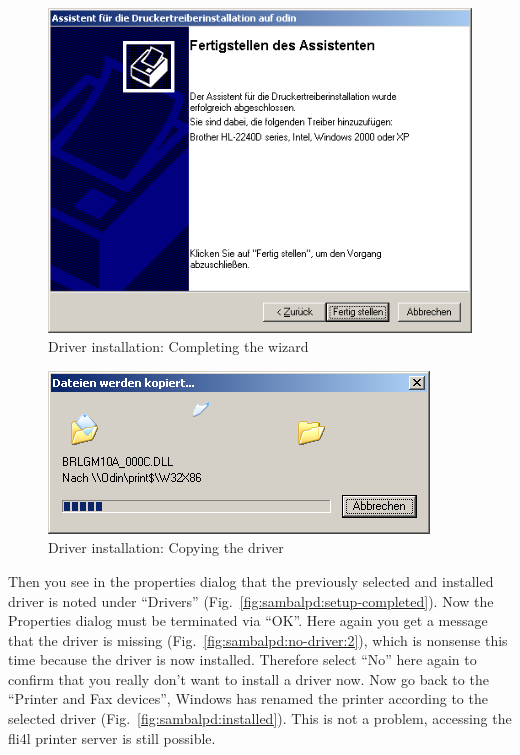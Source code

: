 \begin{figure}[hbt!]
\centering
\includegraphics[width=\columnwidth]{image013}
\caption{Driver installation: Completing the wizard}
\label{fig:sambalpd:setup-end}
\end{figure}

\begin{figure}[hbt!]
\centering
\includegraphics[width=\columnwidth]{image014}
\caption{Driver installation: Copying the driver}
\label{fig:sambalpd:driver-copy}
\end{figure}

Then you see in the properties dialog that the previously selected and
installed driver is noted under ``Drivers''
(Fig.~\ref{fig:sambalpd:setup-completed}). Now the Properties dialog must
be terminated via ``OK''. Here again you get a message that the
driver is missing (Fig.~\ref{fig:sambalpd:no-driver:2}), which is nonsense
this time because the driver is now installed. Therefore select ``No'' here
again to confirm that you really don't want to install a driver now.
Now go back to the ``Printer and Fax devices'', Windows has renamed the
printer according to the selected driver (Fig.~\ref{fig:sambalpd:installed}).
This is not a problem, accessing the fli4l printer server is still possible.

